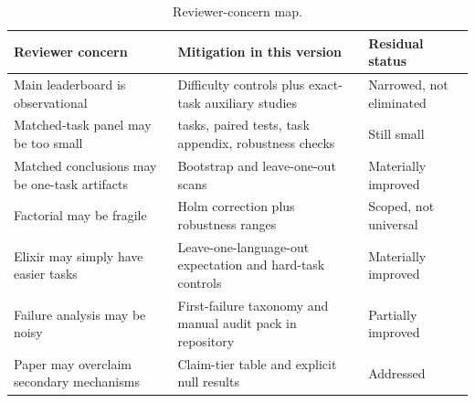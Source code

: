 \documentclass[11pt]{article}
\begin{document}
\begin{table}[H]
\centering
\caption{Reviewer-concern map.}
\label{tab:reviewer}
\small
\begin{tabularx}{\textwidth}{>{\raggedright\arraybackslash}X >{\raggedright\arraybackslash}X >{\raggedright\arraybackslash}X}
\toprule
Reviewer concern & Mitigation in this version & Residual status \\
\midrule
Main leaderboard is observational & Difficulty controls plus exact-task auxiliary studies & Narrowed, not eliminated \\
Matched-task panel may be too small & 16 tasks, paired tests, task appendix, robustness checks & Still small \\
Matched conclusions may be one-task artifacts & Bootstrap and leave-one-out scans & Materially improved \\
Factorial may be fragile & Holm correction plus robustness ranges & Scoped, not universal \\
Elixir may simply have easier tasks & Leave-one-language-out expectation and hard-task controls & Materially improved \\
Failure analysis may be noisy & First-failure taxonomy and manual audit pack in repository & Partially improved \\
Paper may overclaim secondary mechanisms & Claim-tier table and explicit null results & Addressed \\
\bottomrule
\end{tabularx}
\end{table}
\end{document}
